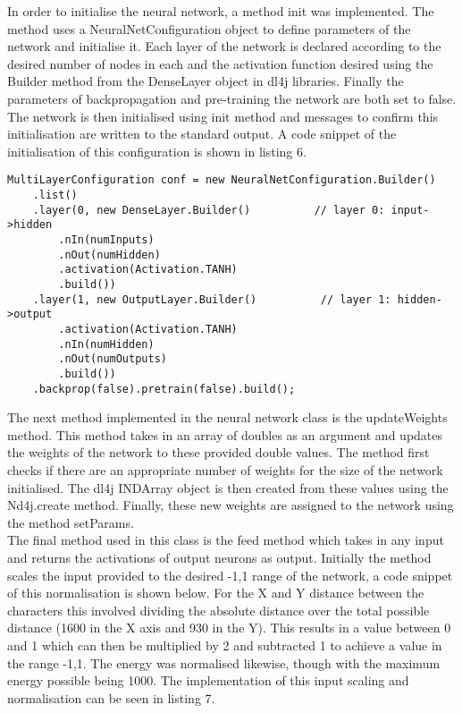 \documentclass[12pt,a4paper]{article}
\begin{document}
In order to initialise the neural network, a method init was implemented. The method uses a NeuralNetConfiguration object to define parameters of the network and initialise it. Each layer of the network is declared according to the desired number of nodes in each and the activation function desired using the Builder method from the DenseLayer object in dl4j libraries. Finally the parameters of backpropagation and pre-training the network are both set to false. The network is then initialised using init method and messages to confirm this initialisation are written to the standard output. A code snippet of the initialisation of this configuration is shown in listing 6.

\singlespacing
\begin{lstlisting}[caption=MultiLayerConfiguration object from the dl4j library]
MultiLayerConfiguration conf = new NeuralNetConfiguration.Builder()
	.list()
	.layer(0, new DenseLayer.Builder()          // layer 0: input->hidden
		.nIn(numInputs)
		.nOut(numHidden)
		.activation(Activation.TANH)
		.build())
	.layer(1, new OutputLayer.Builder()          // layer 1: hidden->output
		.activation(Activation.TANH)
		.nIn(numHidden)
		.nOut(numOutputs)
		.build())
	.backprop(false).pretrain(false).build();
\end{lstlisting}
\onehalfspace
\vspace{3mm}

The next method implemented in the neural network class is the updateWeights method. This method takes in an array of doubles as an argument and updates the weights of the network to these provided double values. The method first checks if there are an appropriate number of weights for the size of the network initialised. The dl4j INDArray object is then created from these values using the Nd4j.create method. Finally, these new weights are assigned to the network using the method setParams.\\

\newpage
The final method used in this class is the feed method which takes in any input and returns the activations of output neurons as output. Initially the method scales the input provided to the desired -1,1 range of the network, a code snippet of this normalisation is shown below. For the X and Y distance between the characters this involved dividing the absolute distance over the total possible distance (1600 in the X axis and 930 in the Y). This results in a value between 0 and 1 which can then be multiplied by 2 and subtracted 1 to achieve a value in the range -1,1. The energy was normalised likewise, though with the maximum energy possible being 1000. The implementation of this input scaling and normalisation can be seen in listing 7.\\ 
\end{document}
